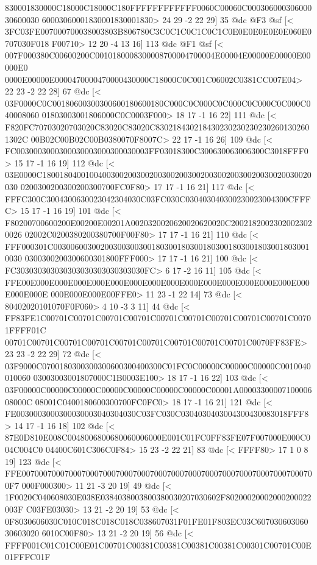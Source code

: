 {{{{{{{{{{{{{{{{{{{{{{{{{{{{{{{{{{{{{{{{{{{{{{{{{{{{{{{{{{{{{{{{{{{{{{{{{{{{{{{{{{{{{{{{{{{{{{{{{{{{{830001830000C18000C18000C180FFFFFFFFFFFF0060C00060C00030600030600030600030
60003060001830001830001830>
	 24 29 -2 22 29] 35 @dc
@F3 @sf
[<
3FC03FE007000700038003803B806780C3C0C1C0C1C0C1C0E0E0E0E0E0E060E0707030F018
F00710>
	 12 20 -4 13 16] 113 @dc
@F1 @sf
[<
007F000380C00600200C0010180008300008700004700004E00004E00000E00000E00000E0
0000E00000E0000470000470000430000C18000C0C001C06002C0381CC007E04>
	 22 23 -2 22 28] 67 @dc
[<
03F0000C0C00180600300300600180600180C000C0C000C0C000C0C000C0C000C040008060
01803003001806000C0C0003F000>
	 18 17 -1 16 22] 111 @dc
[<
F820FC70703020703020C83020C83020C8302184302184302302302302302601302601302C
00B02C00B02C00B0380070F8007C>
	 22 17 -1 16 26] 109 @dc
[<
FC0030003000300030003000300030003FF03018300C300630063006300C3018FFF0>
	 15 17 -1 16 19] 112 @dc
[<
03E0000C180018040010040030020030020030020030020030020030020030020030020030
0200300200300200300700FC0F80>
	 17 17 -1 16 21] 117 @dc
[<
FFFC300C3004300630023042304030C03FC030C030403040300230023004300CFFFC>
	 15 17 -1 16 19] 101 @dc
[<
F80200700600200E00200E00201A0020320020620020620020C20021820023020023020026
02002C0200380200380700F00F80>
	 17 17 -1 16 21] 110 @dc
[<
FFF000301C0030060030020030030030018030018030018030018030018030018030010030
0300300200300600301800FFF000>
	 17 17 -1 16 21] 100 @dc
[<
FC303030303030303030303030303030FC>
	 6 17 -2 16 11] 105 @dc
[<
FFE00E000E000E000E000E000E000E000E000E000E000E000E000E000E000E000E000E000E
000E000E000E00FFE0>
	 11 23 -1 22 14] 73 @dc
[<
80402020101070F0F060>
	 4 10 -3 3 11] 44 @dc
[<
FF83FE1C00701C00701C00701C00701C00701C00701C00701C00701C00701C00701FFFF01C
00701C00701C00701C00701C00701C00701C00701C00701C00701C0070FF83FE>
	 23 23 -2 22 29] 72 @dc
[<
03F9000C0700180300300300600300400300C01FC0C00000C00000C00000C0010040010060
03003003001807000C1B0003E100>
	 18 17 -1 16 22] 103 @dc
[<
03F00000C00000C00000C00000C00000C00000C00000C00001A0000330000710000608000C
08001C0400180600300700FC0FC0>
	 18 17 -1 16 21] 121 @dc
[<
FE0030003000300030003040304030C03FC030C0304030403004300430083018FFF8>
	 14 17 -1 16 18] 102 @dc
[<
87E0D810E008C0048006800680060006000E001C01FC0FF83FE07F007000E000C004C004C0
04400C601C306C0F84>
	 15 23 -2 22 21] 83 @dc
[<
FFFF80>
	 17 1 0 8 19] 123 @dc
[<
FFE007000700070007000700070007000700070007000700070007000700070007000700F7
000F000300>
	 11 21 -3 20 19] 49 @dc
[<
1F0020C040608030E038E0384038003800380030207030602F80200020002000200022003F
C03FE03030>
	 13 21 -2 20 19] 53 @dc
[<
0F8030606030C010C018C018C018C038607031F01FE01F803EC03C60703060306030603020
6010C00F80>
	 13 21 -2 20 19] 56 @dc
[<
FFFF001C01C01C00E01C00701C00381C00381C00381C00381C00301C00701C00E01FFFC01F
}}}}}}}}}}}}}}}}}}}}}}}}}}}}}}}}}}}}}}}}}}}}}}}}}}}}}}}}}}}}}}}}}}}}}}}}}}}}}}}}}}}}}}}}}}}}}}}}}}}}}
